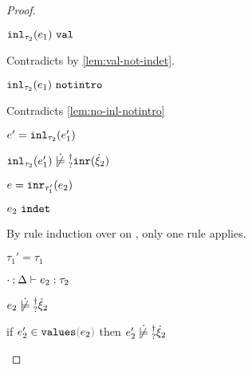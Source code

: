 \begin{proof}
\begin{byCases}
\begin{byCases}
\begin{byCases}
\begin{byCases}
\begin{pfsteps*}
            \item $\mathtt{inl}_{\tau_2}({e_1}) ~\mathtt{val}$ 
            \end{pfsteps*}
            Contradicts  by \autoref{lem:val-not-indet}.
          \item[\text{(\ref{rule:IVIndet})}]
            \begin{pfsteps*}
            \item $\mathtt{inl}_{\tau_2}({e_1}) ~\mathtt{notintro}$ 
            \end{pfsteps*}
            Contradicts \autoref{lem:no-inl-notintro} 
          \item[\text{(\ref{rule:IVInl})}]
            \begin{pfsteps*}
            \item $e'=\mathtt{inl}_{\tau_2}({e_1'})$ 
            \item $\cnotsatisfyormay{\hinl{\tau_2}{e_1'}}{\cinr{\hxi_2}}$
            \end{pfsteps*}
          \end{byCases}
        \item[\text{(\ref{rule:IInr})}]
          \begin{pfsteps*}
          \item $e=\mathtt{inr}_{\tau_1'}({e_2})$ 
          \item $e_2 ~\mathtt{indet}$  
          \end{pfsteps*}
          By rule induction over  on , only one
          rule applies.
          \begin{byCases}
          \item[\text{(\ref{rule:TInr})}]
            \begin{pfsteps*}
            \item $\tau_1'=\tau_1$ 
            \item $\cdot \mathbin{;} \Delta \vdash e_2 : \tau_2$ 
            \item $\cnotsatisfyormay{e_2}{\hxi_2}$
            \item if $\inValues{e_2'}{e_2}$ then
              $\cnotsatisfyormay{e_2'}{\hxi_2}$ 
\end{pfsteps*}
\end{byCases}
\end{byCases}
\end{byCases}
\end{byCases}
\end{proof}
